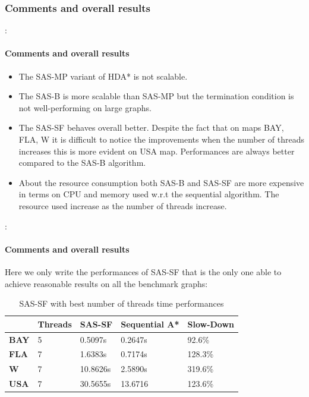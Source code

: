 \documentclass[12pt]{beamer}
\begin{document}
	\subsubsection{Comments and overall results}
	\begin{frame}{\secname : \subsecname}
		\framesubtitle{Comments and overall results}
		\begin{itemize}
		\item The SAS-MP variant of HDA* is not scalable.
		\item The SAS-B is more scalable
				than SAS-MP but the termination condition is not well-performing on large graphs.
		\item The SAS-SF behaves overall better.
				Despite the fact that on maps BAY, FLA, W it is difficult to notice the improvements when
				the number of threads increases this is more evident on USA map. Performances are always
				better compared to the SAS-B algorithm.
		\item About the resource consumption both SAS-B and SAS-SF are more expensive in terms on CPU and 
				memory used w.r.t the sequential algorithm. The resource used increase as the number of threads
				increase.
		\end{itemize}
	\end{frame}
	\begin{frame}{\secname : \subsecname}
		\framesubtitle{Comments and overall results}
		Here we only write the performances of SAS-SF that is the only one able to achieve reasonable results
		on all the benchmark graphs:
		\begin{table}[ht!]
			\centering
			\caption{SAS-SF with best number of threads time performances}
			\begin{tabular}{|l|l|l|l|l|}
			\hline
			\textbf{}    & \textbf{Threads} & \textbf{SAS-SF} & \textbf{Sequential A*} & \textbf{Slow-Down}\\ \hline
			\textbf{BAY} & 5        & 0.5097s                & 0.2647s  &92.6\%          \\ \hline
			\textbf{FLA} & 7        & 1.6383s                & 0.7174s  & 128.3\%          \\ \hline
			\textbf{W}   & 7        & 10.8626s                & 2.5890s &319.6\%           \\ \hline
			\textbf{USA} & 7         & 30.5655s               & 13.6716 &123.6\%           \\ \hline
			\end{tabular}
			\label{tablesas}
		  \end{table}
	\end{frame}
\end{document}
